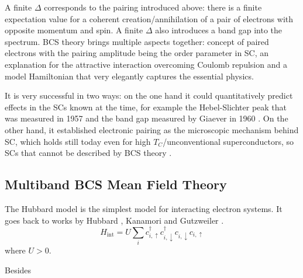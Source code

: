 \documentclass[../notes.tex]{subfiles}
\begin{document}
A finite \(\Delta\) corresponds to the pairing introduced above: there is a finite expectation value for a coherent creation/annihilation of a pair of electrons with opposite momentum and spin.
A finite \(\Delta\) also introduces a band gap into the spectrum.
BCS theory brings multiple aspects together: concept of paired electrons with the pairing amplitude being the order parameter in SC, an explanation for the attractive interaction overcoming Coulomb repulsion and a model Hamiltonian that very elegantly captures the essential physics.

It is very successful in two ways: on the one hand it could quantitatively predict effects in the SCs known at the time, for example the Hebel-Slichter peak that was measured in 1957 \cite{hebelNuclearRelaxationSuperconducting1957, hebelNuclearSpinRelaxation1959} and the band gap measured by Giaever in 1960 \cite{giaeverStudySuperconductorsElectron1961}.  
On the other hand, it established electronic pairing as the microscopic mechanism behind SC, which holds still today even for high \(T_C\)/unconventional superconductors, so SCs that cannot be described by BCS theory \cite{zhouHightemperatureSuperconductivity2021}.


\subsection{Multiband BCS Mean Field Theory}\label{ssec:Multiband BCS Mean Field Theory}

The Hubbard model is the simplest model for interacting electron systems.
It goes back to works by Hubbard \cite{hubbardElectronCorrelationsNarrow1963}, Kanamori \cite{kanamoriElectronCorrelationFerromagnetism1963} and Gutzweiler \cite{gutzwillerEffectCorrelationFerromagnetism1963}.
\begin{equation}
	H_{\mathrm{int}} = U \sum_{i} c_{i, \uparrow}^{\dagger} c_{i, \downarrow}^{\dagger} c_{i, \downarrow} c_{i, \uparrow}
\end{equation}
where \(U > 0\).

Besides 

\cite{qinHubbardModelComputational2022}

\end{document}
